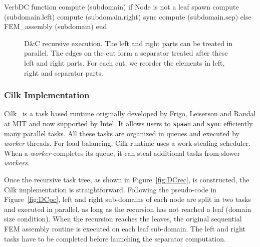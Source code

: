 \documentclass[10pt]{IOS-Book-Article}
\begin{document}
\begin{SaveVerbatim}[]{VerbDC}
function compute (subdomain) 
  if Node is not a leaf
    spawn compute (subdomain.left)
    compute (subdomain.right)
    sync
    compute (subdomain.sep)
  else
    FEM_assembly (subdomain)
end    
\end{SaveVerbatim}

\begin{figure}[htp]
\caption{D\&C recursive execution. The left and right parts can be treated in parallel.
The edges on the cut form a separator treated after these left and right parts.
For each cut, we reorder the elements in left, right and separator parts.}
\end{figure}

\subsubsection{Cilk Implementation}
Cilk~\cite{cilk5} is a task based runtime originally developed by Frigo, Leiserson and Randal at MIT and now supported by Intel.
It allows users to {\tt spawn} and {\tt sync} efficiently many parallel tasks.
All these tasks are organized in queues and executed by \emph{worker} threads.
For load balancing, Cilk runtime uses a work-stealing scheduler.
When a \emph{worker} completes its queue, it can steal additional tasks from slower \emph{workers}.

Once the recursive task tree, as shown in Figure~\ref{fig:DCrec}, is constructed, the Cilk implementation is straightforward.
Following the pseudo-code in Figure~\ref{fig:DCpc}, left and right sub-domains of each node are split in two tasks and executed in parallel, as long as the recursion has not reached a leaf (domain size condition).
When the recursion reaches the leaves, the original sequential FEM assembly routine is executed on each leaf sub-domain.
The left and right tasks have to be completed before launching the separator computation. 
\end{document}
